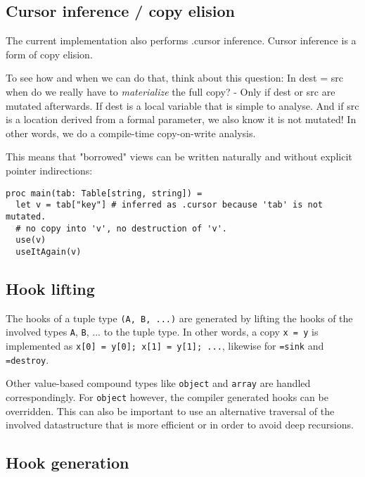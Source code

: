\hypertarget{cursor-inference-copy-elision}{%
\subsection{Cursor inference / copy
elision}\label{cursor-inference-copy-elision}}

The current implementation also performs {.cursor} inference. Cursor
inference is a form of copy elision.

To see how and when we can do that, think about this question: In {dest
= src} when do we really have to \emph{materialize} the full copy? -
Only if {dest} or {src} are mutated afterwards. If {dest} is a local
variable that is simple to analyse. And if {src} is a location derived
from a formal parameter, we also know it is not mutated! In other words,
we do a compile-time copy-on-write analysis.

This means that "borrowed" views can be written naturally and without
explicit pointer indirections:

\begin{verbatim}
proc main(tab: Table[string, string]) =
  let v = tab["key"] # inferred as .cursor because 'tab' is not mutated.
  # no copy into 'v', no destruction of 'v'.
  use(v)
  useItAgain(v)
\end{verbatim}

\hypertarget{hook-lifting}{%
\subsection{Hook lifting}\label{hook-lifting}}

The hooks of a tuple type \texttt{(A,\ B,\ ...)} are generated by
lifting the hooks of the involved types \texttt{A}, \texttt{B}, ... to
the tuple type. In other words, a copy \texttt{x\ =\ y} is implemented
as \texttt{x{[}0{]}\ =\ y{[}0{]};\ x{[}1{]}\ =\ y{[}1{]};\ ...},
likewise for \texttt{=sink} and \texttt{=destroy}.

Other value-based compound types like \texttt{object} and \texttt{array}
are handled correspondingly. For \texttt{object} however, the compiler
generated hooks can be overridden. This can also be important to use an
alternative traversal of the involved datastructure that is more
efficient or in order to avoid deep recursions.

\hypertarget{hook-generation}{%
\subsection{Hook generation}\label{hook-generation}}

